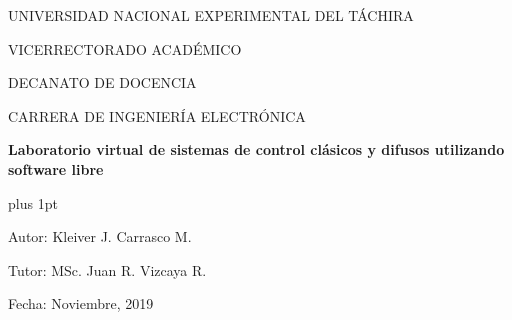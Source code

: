 \begin{center}
	\begin{spacing}{1}
		UNIVERSIDAD NACIONAL EXPERIMENTAL DEL TÁCHIRA
		
		VICERRECTORADO ACADÉMICO
		
		DECANATO DE DOCENCIA
		
		CARRERA DE INGENIERÍA ELECTRÓNICA
	
		\vspace{30pt}

		{\large \textbf{Laboratorio virtual de sistemas de control clásicos y difusos utilizando software libre}\par}
	
	\end{spacing}
\end{center}

\vspace{20pt}

\begin{flushright}
	\begin{spacing}{1}
		\parskip=0pt plus 1pt

		Autor: Kleiver J. Carrasco M.

		Tutor: MSc. Juan R. Vizcaya R.

		Fecha: Noviembre, 2019
		
	\end{spacing}	
\end{flushright}

\vspace{10pt}

\begin{abstract}
	\blindtext
	\blindtext
\end{abstract}

